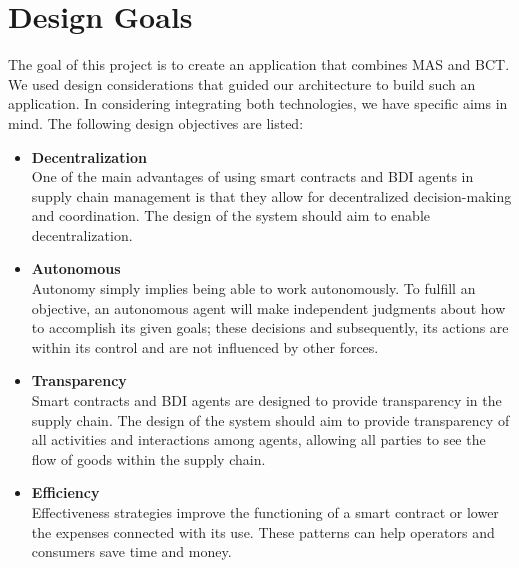 \section{Design Goals}

The goal of this project is to create an application that combines \ac{MAS} and \ac{BCT}. We used design considerations that guided our architecture to build such an application.
In considering integrating both technologies, we have specific aims in mind. The following design objectives are listed:
\vspace{.5cm}
\begin{itemize}

    \item \textbf{Decentralization} \\ One of the main advantages of using smart contracts and \ac{BDI} agents in supply chain management is that they allow for decentralized decision-making and coordination. The design of the system should aim to enable decentralization.

    \vspace{.5cm}
    
    \item \textbf{Autonomous} \\Autonomy simply implies being able to work autonomously. To fulfill an objective, an autonomous agent will make independent judgments about how to accomplish its given goals; these decisions and subsequently, its actions are within its control and are not influenced by other forces.

    \vspace{.5cm}

    \item \textbf{Transparency} \\ Smart contracts and \ac{BDI} agents are designed to provide transparency in the supply chain. The design of the system should aim to provide transparency of all activities and interactions among agents, allowing all parties to see the flow of goods within the supply chain.

    \vspace{.5cm}
    
    \item \textbf{Efficiency} \\
    Effectiveness strategies improve the functioning of a smart contract or lower the expenses connected with its use. These patterns can help operators and consumers save time and money.
    
    \vspace{.5cm}


\end{itemize}
